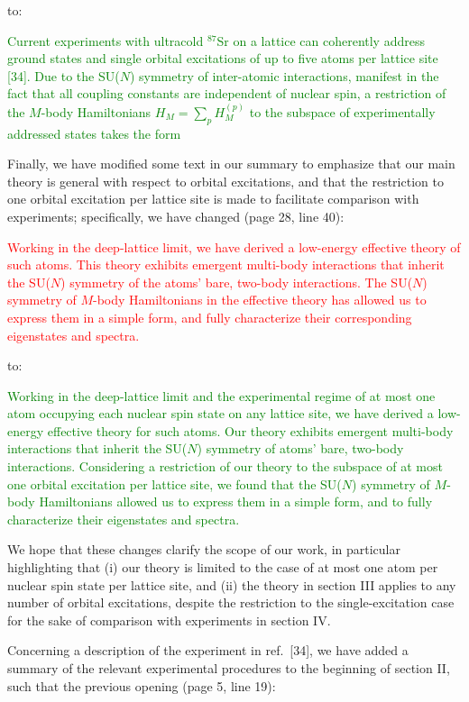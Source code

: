 \documentclass[preprint]{revtex4-1}
\newcommand{\1}{\mathds{1}}
\newcommand{\red}[1]{\textcolor{red}{#1}}
\newcommand{\green}[1]{\textcolor{green}{#1}}
\begin{document}
\begin{enumerate}
  to:

  \green{Current experiments with ultracold ${}^{87}$Sr on a lattice
    can coherently address ground states and single orbital
    excitations of up to five atoms per lattice site [34].  Due to the
    SU($N$) symmetry of inter-atomic interactions, manifest in the
    fact that all coupling constants are independent of nuclear spin,
    a restriction of the $M$-body Hamiltonians $H_M=\sum_p H_M^{(p)}$
    to the subspace of experimentally addressed states takes the form}

  Finally, we have modified some text in our summary to emphasize that
  our main theory is general with respect to orbital excitations, and
  that the restriction to one orbital excitation per lattice site is
  made to facilitate comparison with experiments; specifically, we
  have changed (page 28, line 40):

  \red{Working in the deep-lattice limit, we have derived a low-energy
    effective theory of such atoms. This theory exhibits emergent
    multi-body interactions that inherit the SU($N$) symmetry of the
    atoms' bare, two-body interactions. The SU($N$) symmetry of
    $M$-body Hamiltonians in the effective theory has allowed us to
    express them in a simple form, and fully characterize their
    corresponding eigenstates and spectra.}

  to:

  \green{Working in the deep-lattice limit and the experimental regime
    of at most one atom occupying each nuclear spin state on any
    lattice site, we have derived a low-energy effective theory for
    such atoms.  Our theory exhibits emergent multi-body interactions
    that inherit the SU($N$) symmetry of atoms' bare, two-body
    interactions.  Considering a restriction of our theory to the
    subspace of at most one orbital excitation per lattice site, we
    found that the SU($N$) symmetry of $M$-body Hamiltonians allowed
    us to express them in a simple form, and to fully characterize
    their eigenstates and spectra.}

  We hope that these changes clarify the scope of our work, in
  particular highlighting that (i) our theory is limited to the case
  of at most one atom per nuclear spin state per lattice site, and
  (ii) the theory in section III applies to any number of orbital
  excitations, despite the restriction to the single-excitation case
  for the sake of comparison with experiments in section IV.

  Concerning a description of the experiment in ref.~[34], we have
  added a summary of the relevant experimental procedures to the
  beginning of section II, such that the previous opening (page 5,
  line 19):


\end{enumerate}
\end{document}
